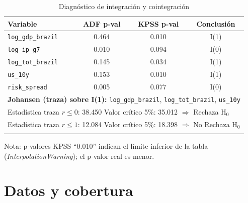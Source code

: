 \documentclass[11pt,a4paper]{article}
\numberwithin{equation}{section}
\begin{document}
\begin{table}[t]
\centering
\begin{threeparttable}
\caption{Diagnóstico de integración y cointegración}
\label{tab:stationarity_johansen}
\begin{tabular}{lccc}
\toprule
\textbf{Variable} & \textbf{ADF p-val} & \textbf{KPSS p-val} & \textbf{Conclusión} \\
\midrule
\texttt{log\_gdp\_brazil}  & 0.464 & 0.010 & I(1) \\
\texttt{log\_ip\_g7}       & 0.010 & 0.094 & I(0) \\
\texttt{log\_tot\_brazil}  & 0.145 & 0.034 & I(1) \\
\texttt{us\_10y}           & 0.153 & 0.010 & I(1) \\
\texttt{risk\_spread}      & 0.005 & 0.077 & I(0) \\
\midrule
\multicolumn{4}{l}{\textbf{Johansen (traza) sobre I(1):} \texttt{log\_gdp\_brazil}, \texttt{log\_tot\_brazil}, \texttt{us\_10y}} \\
\multicolumn{4}{l}{Estadística traza $r\leq 0$: 38.450 \quad Valor crítico 5\%: 35.012 \quad $\Rightarrow$ Rechaza H$_0$} \\
\multicolumn{4}{l}{Estadística traza $r\leq 1$: 12.084 \quad Valor crítico 5\%: 18.398 \quad $\Rightarrow$ No Rechaza H$_0$} \\
\addlinespace
\multicolumn{4}{l}{\textbf{Veredicto:} $r=1$ relación de cointegración.} \\
\bottomrule
\end{tabular}
\begin{tablenotes}\footnotesize
\item Nota: p-valores KPSS “0.010” indican el límite inferior de la tabla (\emph{InterpolationWarning}); el p-valor real es menor.
\end{tablenotes}
\end{threeparttable}
\end{table}


\section{Datos y cobertura}
\end{document}
